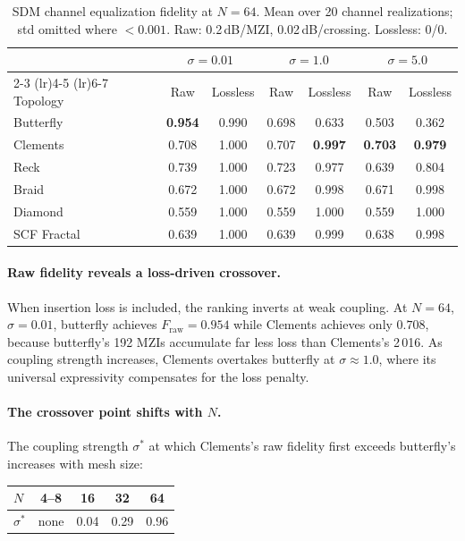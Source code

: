 \documentclass[11pt,a4paper]{article}
\begin{document}
\begin{table}[H]
\centering
\caption{SDM channel equalization fidelity at $N{=}64$.  Mean over 20
channel realizations; std omitted where $< 0.001$.
Raw: 0.2\,dB/MZI, 0.02\,dB/crossing.  Lossless: 0/0.}
\label{tab:sdm_n64}
\begin{tabular}{lcccccc}
\toprule
& \multicolumn{2}{c}{$\sigma = 0.01$} & \multicolumn{2}{c}{$\sigma = 1.0$} & \multicolumn{2}{c}{$\sigma = 5.0$} \\
\cmidrule(lr){2-3} \cmidrule(lr){4-5} \cmidrule(lr){6-7}
Topology & Raw & Lossless & Raw & Lossless & Raw & Lossless \\
\midrule
Butterfly   & \textbf{0.954} & 0.990 & 0.698 & 0.633 & 0.503 & 0.362 \\
Clements    & 0.708 & 1.000 & 0.707 & \textbf{0.997} & \textbf{0.703} & \textbf{0.979} \\
Reck        & 0.739 & 1.000 & 0.723 & 0.977 & 0.639 & 0.804 \\
Braid       & 0.672 & 1.000 & 0.672 & 0.998 & 0.671 & 0.998 \\
Diamond     & 0.559 & 1.000 & 0.559 & 1.000 & 0.559 & 1.000 \\
SCF Fractal & 0.639 & 1.000 & 0.639 & 0.999 & 0.638 & 0.998 \\
\bottomrule
\end{tabular}
\end{table}

\paragraph{Raw fidelity reveals a loss-driven crossover.}
When insertion loss is included, the ranking inverts at weak coupling.
At $N{=}64$, $\sigma = 0.01$, butterfly achieves $F_{\mathrm{raw}} = 0.954$
while Clements achieves only $0.708$, because butterfly's 192 MZIs accumulate
far less loss than Clements's 2\,016.  As coupling strength increases,
Clements overtakes butterfly at $\sigma \approx 1.0$, where its universal
expressivity compensates for the loss penalty.

\paragraph{The crossover point shifts with $N$.}
The coupling strength $\sigma^*$ at which Clements's raw fidelity first
exceeds butterfly's increases with mesh size:

\begin{center}
\begin{tabular}{lcccc}
\toprule
$N$ & 4--8 & 16 & 32 & 64 \\
\midrule
$\sigma^*$ & none & 0.04 & 0.29 & 0.96 \\
\bottomrule
\end{tabular}
\end{center}
\end{document}
